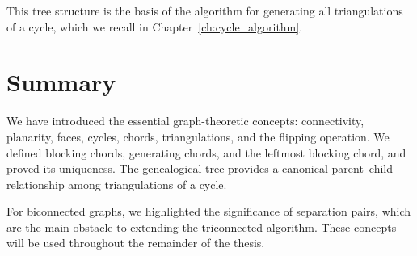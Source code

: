 This tree structure is the basis of the algorithm for generating all triangulations of a cycle, which we recall in Chapter~\ref{ch:cycle_algorithm}.

\section{Summary}
\label{sec:prelim_summary}

We have introduced the essential graph-theoretic concepts: connectivity, planarity, faces, cycles, chords, triangulations, and the flipping operation. 
We defined blocking chords, generating chords, and the leftmost blocking chord, and proved its uniqueness. 
The genealogical tree provides a canonical parent–child relationship among triangulations of a cycle.

For biconnected graphs, we highlighted the significance of separation pairs, which are the main obstacle to extending the triconnected algorithm. 
These concepts will be used throughout the remainder of the thesis.